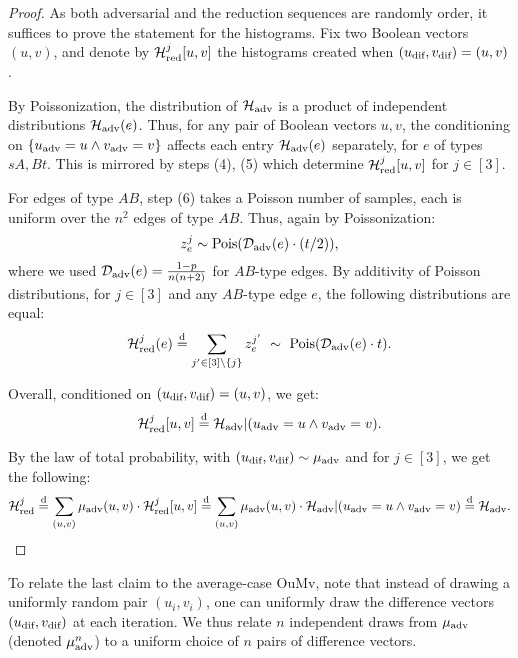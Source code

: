 \documentclass[letter,11pt]{article}
\newcommand{\oumv}{\textnormal{\textsf{OuMv}}\xspace}
\newcommand{\advdist}{\mathcal{D}_\textnormal{adv}}
\newcommand{\advhist}{{\mathcal{H}_\textnormal{adv}}}
\newcommand{\uadv}{u_\textnormal{adv}}
\newcommand{\vadv}{v_\textnormal{adv}}
\newcommand{\muadv}{\mu_\textnormal{adv}}
\newcommand{\redhist}{\mathcal{H}_\textnormal{red}}
\newcommand{\udif}{{u_\textnormal{dif}}}
\newcommand{\vdif}{v_\textnormal{dif}}
\newcommand{\roundnumber}{{t}}
\newcommand{\samedist}{\overset{\mathrm{d}}{=}}
\begin{document}
\begin{proof}
    As both adversarial and the reduction sequences are randomly order, it suffices to prove the statement for the histograms.
    Fix two Boolean vectors $(u,v)$, and denote by $\redhist^j[u,v]$ the histograms created when $(\udif,\vdif) = (u,v)$.

    By Poissonization, the distribution of $\advhist$ is a product of independent distributions $\advhist(e)$. Thus, for any pair of Boolean vectors $u,v$, the conditioning on $\set{\uadv = u \wedge \vadv = v}$ affects each entry $\advhist(e)$ separately, for $e$ of types $sA, Bt$.
    This is mirrored by steps (4), (5) which determine $\redhist^j[u,v]$ for $j\in[3]$.
    
    For edges of type $AB$, step (6) takes a Poisson number of samples, each is uniform over the $n^2$ edges of type $AB$. Thus, again by Poissonization:  
    \[
        z_e^j \sim \poisson{\advdist(e) \cdot (\roundnumber/2)} ,
    \]
    where we used $\advdist(e) = \frac{1-p}{n(n+2)}$ for $AB$-type edges.
    By additivity of Poisson distributions, for $j\in[3]$ and any $AB$-type edge $e$, the following distributions are equal:
    \[
        \redhist^j(e) \samedist \sum_{j'\in[3]\setminus\set{j}} z_e^{j'} \ \sim \  \poisson{\advdist(e) \cdot \roundnumber} .
    \]
    
    Overall, conditioned on $(\udif,\vdif) = (u,v)$, we get:
\begin{equation}
        \label{eq:conditional_equality}
        \redhist^j [u,v]
        \samedist \advhist \vert \left(\uadv = u \wedge \vadv = v \right) .
\end{equation}

    By the law of total probability, with $(\udif,\vdif)\sim \muadv$ and for $j\in[3]$, we get the following:
    \[
        \redhist^j 
        \samedist \sum_{(u,v)} \muadv(u,v) \cdot \redhist^j[u,v]
        \samedist \sum_{(u,v)} \muadv(u,v) \cdot \advhist \vert \left(\uadv = u \wedge \vadv = v \right)
        \samedist \advhist .\qedhere
    \]
\end{proof}

To relate the last claim to the average-case \oumv, note that instead of drawing a uniformly random pair $(u_i, v_i)$, one can uniformly draw the difference vectors $(\udif, \vdif)$ at each iteration.
We thus relate $n$ independent draws from $\muadv$ (denoted $\muadv^{n}$) to a uniform choice of $n$ pairs of difference vectors.
\end{document}
